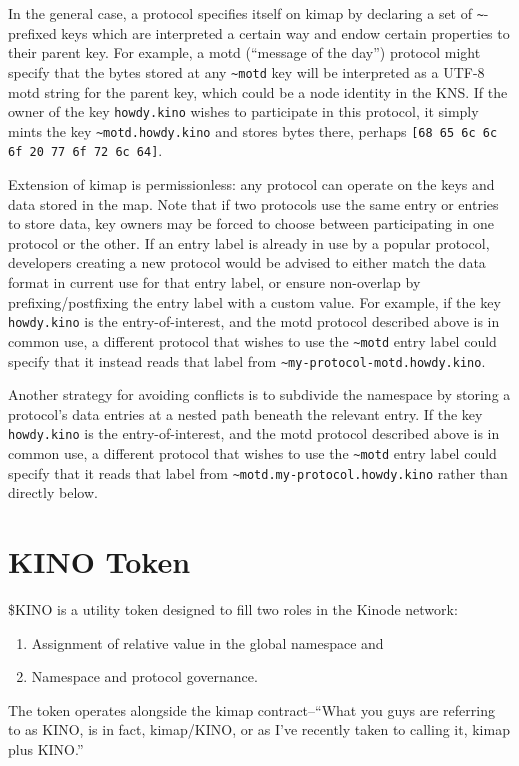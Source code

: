 \documentclass[runningheads]{llncs}
\begin{document}
In the general case, a protocol specifies itself on kimap by declaring a set of \verb|~|-prefixed keys which are interpreted a certain way and endow certain properties to their parent key.
For example, a motd (``message of the day'') protocol might specify that the bytes stored at any \verb|~motd| key will be interpreted as a UTF-8 motd string for the parent key, which could be a node identity in the KNS.
If the owner of the key \verb|howdy.kino| wishes to participate in this protocol, it simply mints the key \verb|~motd.howdy.kino| and stores bytes there, perhaps \verb|[68 65 6c 6c 6f 20 77 6f 72 6c 64]|.


Extension of kimap is permissionless: any protocol can operate on the keys and data stored in the map.
Note that if two protocols use the same entry or entries to store data, key owners may be forced to choose between participating in one protocol or the other.
If an entry label is already in use by a popular protocol, developers creating a new protocol would be advised to either match the data format in current use for that entry label, or ensure non-overlap by prefixing/postfixing the entry label with a custom value.
For example, if the key \verb|howdy.kino| is the entry-of-interest, and the motd protocol described above is in common use, a different protocol that wishes to use the \verb|~motd| entry label could specify that it instead reads that label from \verb|~my-protocol-motd.howdy.kino|.

Another strategy for avoiding conflicts is to subdivide the namespace by storing a protocol's data entries at a nested path beneath the relevant entry.
If the key \verb|howdy.kino| is the entry-of-interest, and the motd protocol described above is in common use, a different protocol that wishes to use the \verb|~motd| entry label could specify that it reads that label from \verb|~motd.my-protocol.howdy.kino| rather than directly below.

\section{KINO Token}
\label{sec:kino}

\$KINO is a utility token designed to fill two roles in the Kinode network:
\begin{enumerate}
\item Assignment of relative value in the global namespace and
\item Namespace and protocol governance.
\end{enumerate}
The token operates alongside the kimap contract–``What you guys are referring to as KINO, is in fact, kimap/KINO, or as I've recently taken to calling it, kimap plus KINO.''%
\end{document}
